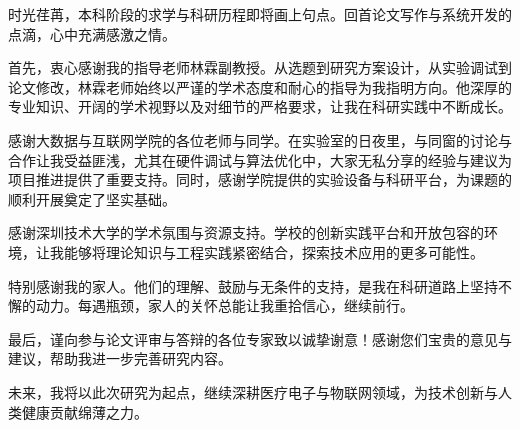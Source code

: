
\begin{thankscontent}
    时光荏苒，本科阶段的求学与科研历程即将画上句点。回首论文写作与系统开发的点滴，心中充满感激之情。

    首先，衷心感谢我的指导老师林霖副教授。从选题到研究方案设计，从实验调试到论文修改，林霖老师始终以严谨的学术态度和耐心的指导为我指明方向。他深厚的专业知识、开阔的学术视野以及对细节的严格要求，让我在科研实践中不断成长。

    感谢大数据与互联网学院的各位老师与同学。在实验室的日夜里，与同窗的讨论与合作让我受益匪浅，尤其在硬件调试与算法优化中，大家无私分享的经验与建议为项目推进提供了重要支持。同时，感谢学院提供的实验设备与科研平台，为课题的顺利开展奠定了坚实基础。

    感谢深圳技术大学的学术氛围与资源支持。学校的创新实践平台和开放包容的环境，让我能够将理论知识与工程实践紧密结合，探索技术应用的更多可能性。

    特别感谢我的家人。他们的理解、鼓励与无条件的支持，是我在科研道路上坚持不懈的动力。每遇瓶颈，家人的关怀总能让我重拾信心，继续前行。

    最后，谨向参与论文评审与答辩的各位专家致以诚挚谢意！感谢您们宝贵的意见与建议，帮助我进一步完善研究内容。

    未来，我将以此次研究为起点，继续深耕医疗电子与物联网领域，为技术创新与人类健康贡献绵薄之力。
    
    
\end{thankscontent}